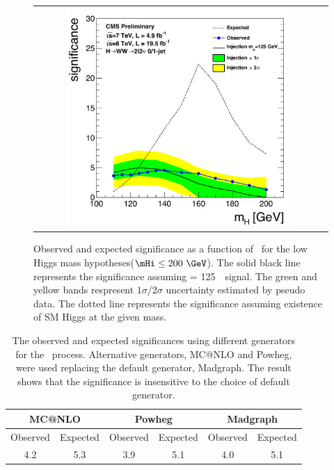 %
\begin{figure}[htp] 
\centering 
\begin{tabular}{c} 
\includegraphics[width=0.8\textwidth]{figures/signif_allcomb_inj125_data_zoom.pdf} 
\end{tabular} 
\caption{Observed and expected significance as a function of \mHi\ for 
the low Higgs mass hypotheses($\mHi\le200~\GeV$). 
The solid black line represents the significance assuming \mHi = 125~\GeV\ signal. 
The green and yellow bands respresent $1\sigma$/$2\sigma$ uncertainty 
estimated by pseudo data. The dotted line represents the significance 
assuming existence of SM Higgs at the given mass. 
} 
\label{fig:significane_mH} 
\end{figure} 

%
\begin{table}[htp] 
\begin{center} 
\begin{tabular}{cc|cc|cc} 
\hline 
\multicolumn{2}{c|}{MC@NLO}   &  \multicolumn{2}{c|}{Powheg} & \multicolumn{2}{c}{Madgraph} \\
\hline \hline 
Observed & Expected & Observed & Expected &  Observed & Expected \\ 
\hline 
4.2 & 5.3 & 3.9 & 5.1 & 4.0 & 5.1 \\
\hline 
\end{tabular} 
\caption{The observed and expected significances
using different generators for the \qqww\ process. Alternative generators,
MC@NLO and Powheg, were used replacing the default generator, Madgraph.
The result shows that the significance is insensitive to the choice
of default generator.} 
\label{tab:sig_diffgenerator} 
\end{center} 
\end{table} 


